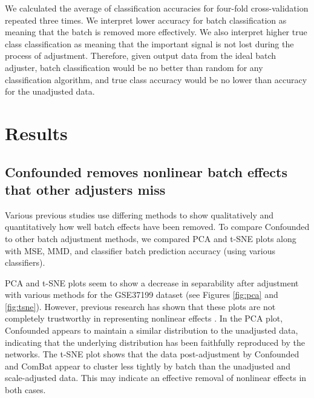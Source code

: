 \documentclass[notitlepage]{article}
\begin{document}
We calculated the average of classification accuracies for four-fold cross-validation repeated three times.
We interpret lower accuracy for batch classification as meaning that the batch is removed more effectively.
We also interpret higher true class classification as meaning that the important signal is not lost during the process of adjustment.
Therefore, given output data from the ideal batch adjuster, batch classification would be no better than random for any classification algorithm, and true class accuracy would be no lower than accuracy for the unadjusted data.

\section{Results} \label{sec:results}

\subsection{Confounded removes nonlinear batch effects that other adjusters miss}

Various previous studies use differing methods to show qualitatively and quantitatively how well batch effects have been removed.
To compare Confounded to other batch adjustment methods, we compared PCA and t-SNE plots along with MSE, MMD, and classifier batch prediction accuracy (using various classifiers).

PCA and t-SNE plots seem to show a decrease in separability after adjustment with various methods for the GSE37199 dataset (see Figures \ref{fig:pca} and \ref{fig:tsne}).
However, previous research has shown that these plots are not completely trustworthy in representing nonlinear effects \cite{dayton_classifying_2017-1}.
In the PCA plot, Confounded appears to maintain a similar distribution to the unadjusted data, indicating that the underlying distribution has been faithfully reproduced by the networks.
The t-SNE plot shows that the data post-adjustment by Confounded and ComBat appear to cluster less tightly by batch than the unadjusted and scale-adjusted data.
This may indicate an effective removal of nonlinear effects in both cases.
\end{document}
